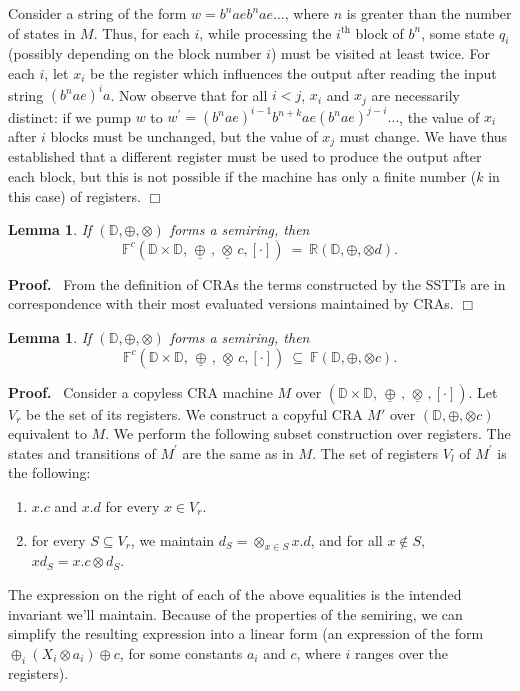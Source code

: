 \documentclass[11pt]{article}
\newtheorem{lemma}[theorem]{Lemma}
\def\Proof{{\bf Proof.}}
\def\qed{{\bf $\Box$}}
\def\qed{{\bf $\Box$}}
\newcommand{\domain}{\ensuremath{\mathbb{D}}}
\newcommand{\CF}{{\mathbb F}}
\newcommand{\CCF}{{\mathbb F}^c}
\newcommand{\reg}[1]{{\mathbb R}(#1)}
\newcommand{\sradd}{\oplus}
\newcommand{\srmul}{\otimes}
\def\myplus{\otimes}
\def\mytimes{\oplus}
\def\dadd{\,\underline\mytimes\,}
\def\dscale{\,\underline\myplus\,}
\begin{document}
Consider a string of the form $w=b^{n}aeb^{n}ae\ldots$, where $n$
is greater than the number of states in $M$. Thus, for each $i$,
while processing the $i^{\mbox{th}}$ block of $b^{n}$, some state
$q_{i}$ (possibly depending on the block number $i$) must be visited
at least twice. For each $i$, let $x_{i}$ be the register which
influences the output after reading the input string $\left(b^{n}ae\right)^{i}a$.
Now observe that for all $i<j$, $x_{i}$ and $x_{j}$ are necessarily
distinct: if we pump $w$ to $w^{\prime}=\left(b^{n}ae\right)^{i-1}b^{n+k}ae\left(b^{n}ae\right)^{j-i}\ldots$,
the value of $x_{i}$ after $i$ blocks must be unchanged, but the
value of $x_{j}$ must change. We have thus established that a different
register must be used to produce the output after each block, but
this is not possible if the machine has only a finite number ($k$ in this case)
of registers.
\qed

\begin{lemma}
If $\left(\domain,\sradd,\srmul\right)$ forms a semiring, then
\[ \CCF\left(\domain\times\domain,\dadd,\dscale c,\left[\cdot\right]\right)\ =\ \reg{\domain,\sradd,\srmul d}. \]
\end{lemma}
\Proof~
From the definition of CRAs the terms constructed by the SSTTs are in correspondence with their most evaluated versions maintained by CRAs.
\qed

\begin{lemma}\label{lemma:reg-to-cra}
If $\left(\domain,\sradd,\srmul\right)$ forms a semiring, then
\[ \CCF\left(\domain\times\domain,\dadd,\dscale c,\left[\cdot\right]\right)\ \subseteq\ \CF(\domain,\sradd,\srmul c). \]
\end{lemma}
\Proof~
Consider a copyless CRA machine $M$ over $\left(\domain\times\domain,\dadd ,\dscale ,\left[\cdot\right]\right)$.
Let $V_{r}$ be the set of its registers. We construct a copyful CRA $M'$
over $\left(\domain,\sradd,\srmul c\right)$ equivalent to $M$.
We perform the following subset construction over registers. The states
and transitions of $M^{\prime}$ are the same as in $M$.
The set of registers $V_{l}$ of $M^{\prime}$ is the following:
\begin{enumerate}
\item $x.c$ and $x.d$ for every $x\in V_{r}$.
\item for every $S\subseteq V_{r}$, we maintain $d_{S}=\srmul_{x\in S}x.d$,
and for all $x\notin S$, $xd_{S}=x.c\srmul d_{S}$.
\end{enumerate}
The expression on the right of each of the above equalities is the
intended invariant we'll maintain. Because of the properties of the
semiring, we can simplify the resulting expression into a linear form (an expression of the form $\sradd_{i}\left(X_{i}\srmul a_{i}\right)\sradd c$, for some constants $a_i$ and $c$, where $i$ ranges over the registers).
\end{document}
